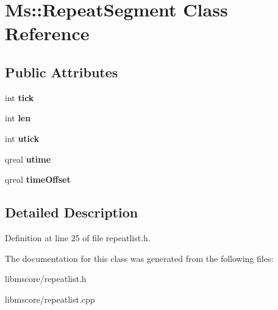\hypertarget{class_ms_1_1_repeat_segment}{}\section{Ms\+:\+:Repeat\+Segment Class Reference}
\label{class_ms_1_1_repeat_segment}
\subsection*{Public Attributes}
\begin{DoxyCompactItemize}
\item 
\mbox{\label{class_ms_1_1_repeat_segment_abe0d339ede48c79c40418c6b6cc189a1}} 
int {\bfseries tick}
\item 
\mbox{\label{class_ms_1_1_repeat_segment_a2f56a376398af168778c41dc92a5c523}} 
int {\bfseries len}
\item 
\mbox{\label{class_ms_1_1_repeat_segment_a5373793f0d793ea1d9b1dd65f38b1b79}} 
int {\bfseries utick}
\item 
\mbox{\label{class_ms_1_1_repeat_segment_ae12ac25bd66b8034acaef2d81682079b}} 
qreal {\bfseries utime}
\item 
\mbox{\label{class_ms_1_1_repeat_segment_a349be9a48c72b3fef91ee898805dc735}} 
qreal {\bfseries time\+Offset}
\end{DoxyCompactItemize}


\subsection{Detailed Description}


Definition at line 25 of file repeatlist.\+h.



The documentation for this class was generated from the following files\+:\begin{DoxyCompactItemize}
\item 
libmscore/repeatlist.\+h\item 
libmscore/repeatlist.\+cpp\end{DoxyCompactItemize}
